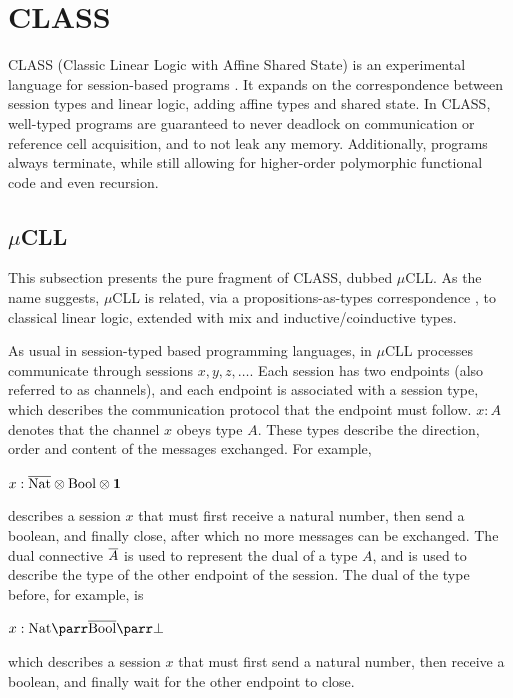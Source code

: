 \section{CLASS}

\ac{CLASS} (Classic Linear Logic with Affine Shared State) is an experimental language for session-based programs \cite{Rocha:2023, Rocha:2022, Rocha:2021}. It expands on the correspondence between session types and linear logic, adding affine types and shared state. In \ac{CLASS}, well-typed programs are guaranteed to never deadlock on communication or reference cell acquisition, and to not leak any memory. Additionally, programs always terminate, while still allowing for higher-order polymorphic functional code and even recursion.

\subsection{\texorpdfstring{$\mu$}{mu}CLL}

This subsection presents the pure fragment of \ac{CLASS}, dubbed $\mu$CLL. As the name suggests, $\mu$CLL is related, via a propositions-as-types correspondence \cite{Caires:2016}, to classical linear logic, extended with mix and inductive/coinductive types.

As usual in session-typed based programming languages, in $\mu$CLL processes communicate through sessions $x, y, z, \ldots$. Each session has two endpoints (also referred to as channels), and each endpoint is associated with a session type, which describes the communication protocol that the endpoint must follow. $x: A$ denotes that the channel $x$ obeys type $A$. These types describe the direction, order and content of the messages exchanged. For example,\\
\centerline{\vspace{2pt}$x : \overline{\text{Nat}} \otimes \text{Bool} \otimes \mathbf{1}$}
describes a session $x$ that must first receive a natural number, then send a boolean, and finally close, after which no more messages can be exchanged. The dual connective $\overline{A}$ is used to represent the dual of a type $A$, and is used to describe the type of the other endpoint of the session. The dual of the type before, for example, is\\
\centerline{\vspace{2pt}$x : \text{Nat} \parr \dual{\text{Bool}} \parr \bot$}
which describes a session $x$ that must first send a natural number, then receive a boolean, and finally wait for the other endpoint to close.

